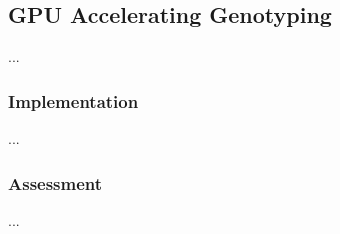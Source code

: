 \subsection{GPU Accelerating Genotyping} \label{methods:gpu_accelerating_genotyping}
...

\subsubsection{Implementation}
...

\subsubsection{Assessment}
...
